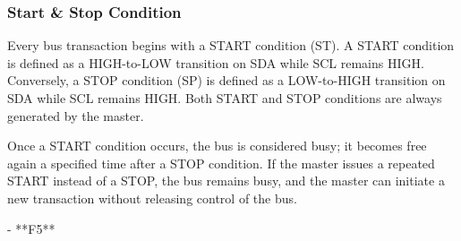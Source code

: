 \subsubsection{Start \& Stop Condition}
\label{chap:Back_I2C_Protocol_Start_Stop}

Every bus transaction begins with a START condition (ST). A START condition 
is defined as a HIGH-to-LOW transition on SDA while SCL remains HIGH. 
Conversely, a STOP condition (SP) is defined as a LOW-to-HIGH transition on SDA 
while SCL remains HIGH. Both START and STOP conditions are always generated 
by the master.

Once a START condition occurs, the bus is considered busy; it becomes free 
again a specified time after a STOP condition. If the master issues a repeated 
START instead of a STOP, the bus remains busy, and the master can initiate a new 
transaction without releasing control of the bus.

- **F5**
